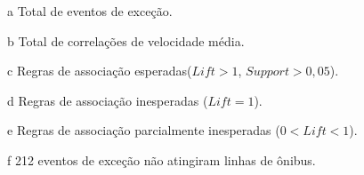 \documentclass[
	12pt,				%
	oneside,			%
	a4paper,			%
	english,			%
	brazil				%
	]{abntex2ppgsi}
\begin{document}
{{\begin{apendicesenv}
\begin{table}[!htb]
\begin{threeparttable}
\begin{tablenotes}
            \item[a] Total de eventos de exceção.
            \item[b] Total de correlações de velocidade média.
            \item[c] Regras de associação esperadas($Lift > 1$, $Support > 0,05$).
            \item[d] Regras de associação inesperadas ($Lift = 1$).
            \item[e] Regras de associação parcialmente inesperadas ($0 < Lift < 1$).
            \item[f] 212 eventos de exceção não atingiram linhas de ônibus.
        \end{tablenotes}
\end{threeparttable}
\end{table}



\end{apendicesenv}}}
\end{document}
